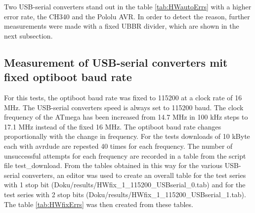 Two USB-serial converters stand out in the table \ref{tab:HWautoErrs} with a higher error rate,
the CH340 and the Pololu AVR.
In order to detect the reason, further measurements were made with a fixed UBBR divider,
which are shown in the next subsection.

\subsection{Measurement of USB-serial converters mit fixed optiboot baud rate}
For this tests, the optiboot baud rate was fixed to 115200
at a clock rate of 16 MHz.
The USB-serial converters speed is always set to 115200 baud.
The clock frequency of the ATmega has been increased from 14.7 MHz in 100 kHz steps
to 17.1 MHz instead of the fixed 16 MHz.
The optiboot baud rate changes proportionally with the change in frequency.
For the tests downloads of 10 kByte each with avrdude are repested 40 times for each frequency.
The number of unsuccessful attempts for each frequency are recorded in a table from the script file test\_download.
From the tables obtained in this way for the various USB-serial converters, an editor was used to create
an overall table for the test series with 1 stop bit (Doku/results/HWfix\_1\_115200\_USBserial\_0.tab)
and for the test series with 2 stop bits (Doku/results/HWfix\_1\_115200\_USBserial\_1.tab).
The table \ref{tab:HWfixErrs} was then created from these tables.

